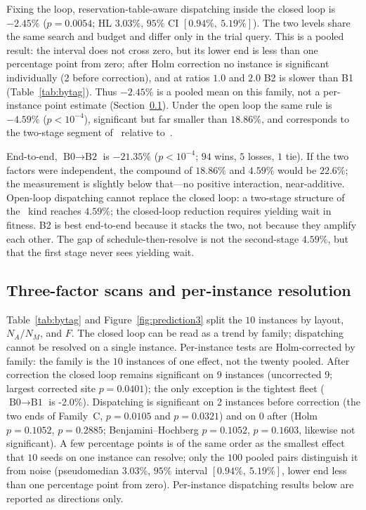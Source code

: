 \documentclass[manuscript,screen,review]{acmart}
\newcommand{\NCases}{10}
\newcommand{\NSeeds}{10}
\newcommand{\NPairs}{100}
\newcommand{\GainLoopRule}{18.86\%}      %
\newcommand{\GainProbeOpen}{4.59\%}      %
\newcommand{\PProbeOpen}{<10^{-4}}
\newcommand{\GainProbeLoop}{2.45\%}      %
\newcommand{\PProbeLoop}{=0.0054}
\newcommand{\GainEndToEnd}{21.35\%}      %
\newcommand{\PEndToEnd}{<10^{-4}}
\newcommand{\WinEndToEnd}{94}
\newcommand{\LoseEndToEnd}{5}
\newcommand{\HLProbeLoop}{3.03\%}
\newcommand{\CIProbeLoop}{$[0.94\%,\ 5.19\%]$}
\newcommand{\GainIndepProduct}{22.6\%}
\newcommand{\CellsSigLoop}{9}
\newcommand{\CellsSigLoopAdj}{9}
\newcommand{\CellsSigProbe}{2}
\newcommand{\CellsSigProbeAdj}{0}
\newcommand{\GainLoopStarve}{-2.0\%}     %
\newcommand{\PProbeFlexLoRaw}{=0.0105}
\newcommand{\PProbeFlexLoHolm}{=0.1052}
\newcommand{\PProbeFlexLoBH}{=0.1052}
\newcommand{\PProbeFlexHiRaw}{=0.0321}
\newcommand{\PProbeFlexHiHolm}{=0.2885}
\newcommand{\PProbeFlexHiBH}{=0.1603}
\newcommand{\PLoopCellMax}{=0.0401}
\begin{document}
Fixing the loop, reservation-table-aware dispatching inside the closed loop is $-\GainProbeLoop$ ($p\PProbeLoop$; HL \HLProbeLoop{}, $95\%$ CI \CIProbeLoop{}).
The two levels share the same search and budget and differ only in the trial query.
This is a pooled result: the interval does not cross zero, but its lower end is less than one percentage point from zero; after Holm correction no instance is significant individually (\CellsSigProbe{} before correction), and at ratios $1.0$ and $2.0$ B2 is slower than B1 (Table~\ref{tab:bytag}).
Thus $-\GainProbeLoop$ is a pooled mean on this family, not a per-instance point estimate (Section~\ref{sec:whichcongestion}).
Under the open loop the same rule is $-\GainProbeOpen$ ($p\PProbeOpen$), significant but far smaller than $\GainLoopRule$, and corresponds to the two-stage segment of~\cite{sun2023integrated} relative to~\cite{li2026framework}.

End-to-end, $\text{B0}\to\text{B2}$ is $-\GainEndToEnd$ ($p\PEndToEnd$; $\WinEndToEnd$ wins, $\LoseEndToEnd$ losses, $1$ tie).
\label{sec:complement}
If the two factors were independent, the compound of $\GainLoopRule$ and $\GainProbeOpen$ would be $\GainIndepProduct$; the measurement is slightly below that---no positive interaction, near-additive.
Open-loop dispatching cannot replace the closed loop: a two-stage structure of the~\cite{sun2023integrated} kind reaches $\GainProbeOpen$; the closed-loop reduction requires yielding wait in fitness.
B2 is best end-to-end because it stacks the two, not because they amplify each other.
The gap of schedule-then-resolve is not the second-stage $\GainProbeOpen$, but that the first stage never sees yielding wait.

\subsection{Three-factor scans and per-instance resolution}
\label{sec:whichcongestion}

Table~\ref{tab:bytag} and Figure~\ref{fig:prediction3} split the $\NCases$ instances by layout, $N_A/N_M$, and $F$.
The closed loop can be read as a trend by family; dispatching cannot be resolved on a single instance.
Per-instance tests are Holm-corrected by family: the family is the $\NCases$ instances of one effect, not the twenty pooled.
After correction the closed loop remains significant on \CellsSigLoopAdj{} instances (uncorrected \CellsSigLoop{}; largest corrected site $p\PLoopCellMax$); the only exception is the tightest fleet ($\text{B0}\to\text{B1}$ is \GainLoopStarve{}).
Dispatching is significant on \CellsSigProbe{} instances before correction (the two ends of Family~C, $p\PProbeFlexLoRaw$ and $p\PProbeFlexHiRaw$) and on \CellsSigProbeAdj{} after (Holm $p\PProbeFlexLoHolm$, $p\PProbeFlexHiHolm$; Benjamini--Hochberg $p\PProbeFlexLoBH$, $p\PProbeFlexHiBH$, likewise not significant).
A few percentage points is of the same order as the smallest effect that $\NSeeds$ seeds on one instance can resolve; only the $\NPairs$ pooled pairs distinguish it from noise (pseudomedian \HLProbeLoop{}, $95\%$ interval \CIProbeLoop{}, lower end less than one percentage point from zero).
Per-instance dispatching results below are reported as directions only.
\end{document}
